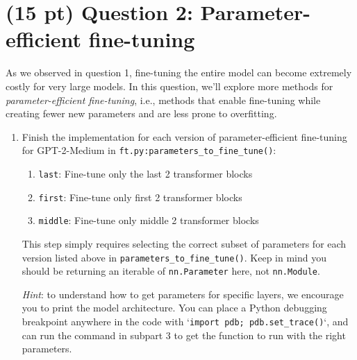 \documentclass[12pt]{article}
\begin{document}
    \section*{(15 pt) Question 2: Parameter-efficient fine-tuning}
    As we observed in question 1, fine-tuning the entire model can become extremely costly for very large models. In this question, we'll explore more methods for \textit{parameter-efficient fine-tuning}, i.e., methods that enable fine-tuning while creating fewer new parameters and are less prone to overfitting.
    \begin{enumerate}
        \item Finish the implementation for each version of parameter-efficient fine-tuning for GPT-2-Medium in \texttt{ft.py:parameters\_to\_fine\_tune()}:
        \begin{enumerate}
            \item \texttt{last}: Fine-tune only the last 2 transformer blocks
            \item \texttt{first}: Fine-tune only first 2 transformer blocks
            \item \texttt{middle}: Fine-tune only middle 2 transformer blocks
        \end{enumerate}
        This step simply requires selecting the correct subset of parameters for each version listed above in \texttt{parameters\_to\_fine\_tune()}. Keep in mind you should be returning an iterable of \texttt{nn.Parameter} here, not \texttt{nn.Module}.

        \emph{Hint}: to understand how to get parameters for specific layers, we encourage you to print the model architecture. You can place a Python debugging breakpoint anywhere in the code with `\texttt{import pdb; pdb.set\_trace()}`, and can run the command in subpart 3 to get the function to run with the right parameters.


\end{enumerate}
\end{document}
